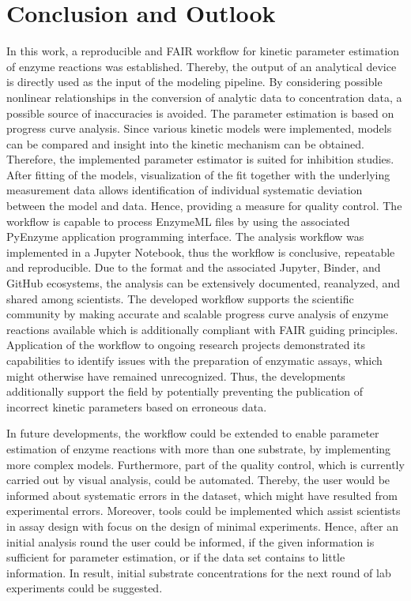 \documentclass[letterpaper,12pt,english]{jupyterBook}
\begin{document}
\chapter{Conclusion and Outlook}
\label{\detokenize{conclusion:conclusion-and-outlook}}\label{\detokenize{conclusion::doc}}
\sphinxAtStartPar
In this work, a reproducible and FAIR workflow for kinetic parameter estimation of enzyme reactions was established. Thereby, the output of an analytical device is directly used as the input of the modeling pipeline. By considering possible nonlinear relationships in the conversion of analytic data to concentration data, a possible source of inaccuracies is avoided. The parameter estimation is based on progress curve analysis. Since various kinetic models were implemented, models can be compared and insight into the kinetic mechanism can be obtained. Therefore, the implemented parameter estimator is suited for inhibition studies. After fitting of the models, visualization of the fit together with the underlying measurement data allows identification of individual systematic deviation between the model and data. Hence, providing a measure for quality control.
The workflow is capable to process EnzymeML files by using the associated PyEnzyme application programming interface. The analysis workflow was implemented in a Jupyter Notebook, thus the workflow is conclusive, repeatable and reproducible.
Due to the format and the associated Jupyter, Binder, and GitHub ecosystems, the analysis can be extensively documented, reanalyzed, and shared among scientists.
The developed workflow supports the scientific community by making accurate and scalable progress curve analysis of enzyme reactions available which is additionally compliant with FAIR guiding principles.
Application of the workflow to ongoing research projects demonstrated its capabilities to identify issues with the preparation of enzymatic assays, which might otherwise have remained unrecognized. Thus, the developments additionally support the field by potentially preventing the publication of incorrect kinetic parameters based on erroneous data.

\sphinxAtStartPar
In future developments, the workflow could be extended to enable parameter estimation of enzyme reactions with more than one substrate, by implementing more complex models. Furthermore, part of the quality control, which is currently carried out by visual analysis, could be automated. Thereby, the user would be informed about systematic errors in the dataset, which might have resulted from experimental errors. Moreover, tools could be implemented which assist scientists in assay design with focus on the design of minimal experiments. Hence, after an initial analysis round the user could be informed, if the given information is sufficient for parameter estimation, or if the data set contains to little information. In result, initial substrate concentrations for the next round of lab experiments could be suggested.
\end{document}

